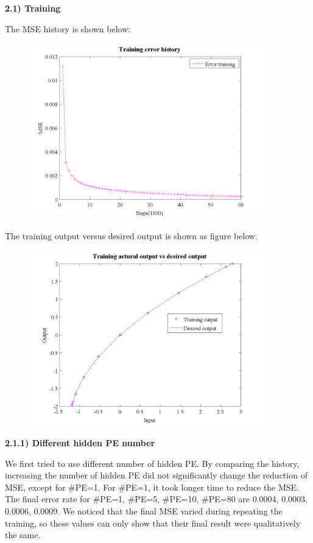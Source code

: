 \documentclass[epsfig]{article}
\def\bpar{\vskip26pt}
\def\npar{\vskip13pt}
\begin{document}
{\bf 
\npar
2.1) Training
\bpar
}
 

The MSE history is shown below:

\begin{figure}[H] 
\centering\includegraphics[width=4in]{MSEhistory_1.png} 
\end{figure} 

The training output versus desired output is shown as figure below.

\begin{figure}[H] 
\centering\includegraphics[width=4in]{TrainvsDesire_1.png} 
\end{figure} 


{\bf 
\npar
2.1.1) Different hidden PE number
\bpar
}

We first tried to use different number of hidden PE. By comparing the history, increasing the number of hidden PE did not significantly change the reduction of MSE, except for $\#$PE=1. For $\#$PE=1, it took longer time to reduce the MSE. The final error rate for $\#$PE=1, $\#$PE=5, $\#$PE=10, $\#$PE=80 are 0.0004, 0.0003, 0.0006, 0.0009. We noticed that the final MSE varied during repeating the training, so these values can only show that their final result were qualitatively the same.
\end{document}
